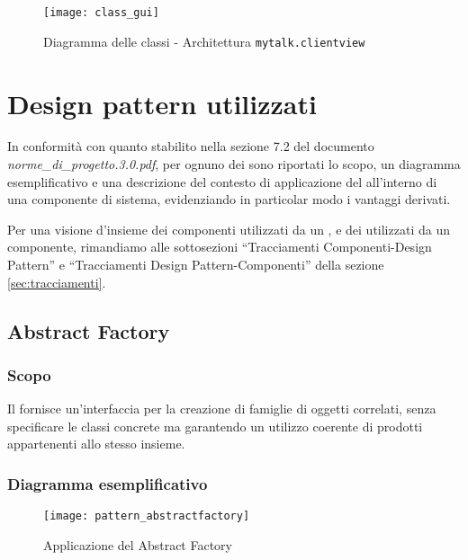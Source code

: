 \begin{figure}[H]
  \centering
  \texttt{[image: class\_gui]}
  \caption{Diagramma delle classi - Architettura \texttt{mytalk.clientview}}\label{fig:sottoarchview}
\end{figure}
\clearpage

\section{Design pattern utilizzati}
In conformità con quanto stabilito nella sezione 7.2 del documento \textit{norme\_di\_progetto.3.0.pdf}, per ognuno dei  sono riportati lo scopo, un diagramma esemplificativo e una descrizione del contesto di applicazione del  all'interno di una componente di sistema, evidenziando in particolar modo i vantaggi derivati.

Per una visione d'insieme dei componenti utilizzati da un , e dei  utilizzati da un componente, rimandiamo alle sottosezioni ``Tracciamenti Componenti-Design Pattern'' e ``Tracciamenti Design Pattern-Componenti'' della sezione \vref{sec:tracciamenti}.

\subsection{Abstract Factory}
\subsubsection{Scopo}
Il  fornisce un'interfaccia per la creazione di famiglie di oggetti correlati, senza specificare le classi concrete ma garantendo un utilizzo coerente di prodotti appartenenti allo stesso insieme.

\subsubsection{Diagramma esemplificativo}
\begin{figure}[h]
  \centering
  \texttt{[image: pattern\_abstractfactory]}
  \caption{Applicazione del  Abstract Factory}\label{fig:abstractfactory}
\end{figure}

